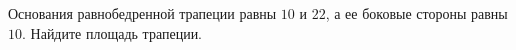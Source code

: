 \begin{ex}
	\begin{condition}
		 Основания равнобедренной трапеции равны \( 10  \) и \( 22 \), а ее боковые стороны равны \( 10 \). Найдите площадь трапеции.
	\end{condition}
\end{ex}
